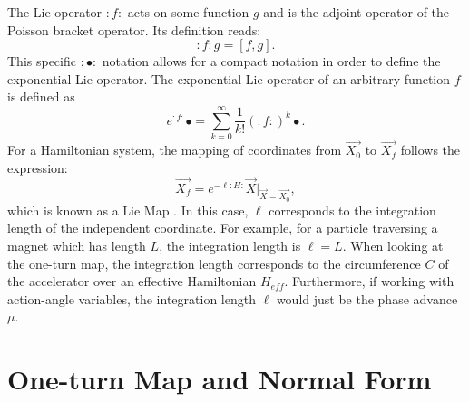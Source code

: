 The Lie operator $:f:$ acts on some function $g$ and is the adjoint operator of the Poisson bracket operator. Its definition reads:
\begin{equation}
    \label{eq:ch2lie1}
    :f:g = \left[ f,g \right].
\end{equation}
This specific $:\bullet:$ notation allows for a compact notation in order to define the exponential Lie operator. The exponential Lie operator of an arbitrary function $f$ is defined as
\begin{equation}
    \label{eq:ch2explie1}
    e^{:f:}\bullet = \sum_{k=0}^{\infty}\frac{1}{k!}\left( :f: \right)^k \bullet.
\end{equation}
For a Hamiltonian system, the mapping of coordinates from $\vec{X_0}$ to $\vec{X_f}$ follows the expression:
\begin{equation}
    \label{eq:ch2liemap1}
    \vec{X_f}=e^{-\ell :H:}\vec{X}\bigg\rvert_{\vec{X}=\vec{X_0}},
\end{equation}
which is known as a Lie Map \cite{todd1}. In this case, $\ell$ corresponds to the integration length of the independent coordinate. For example, for a particle traversing a magnet which has length $L$, the integration length is $\ell = L$. When looking at the one-turn map, the integration length corresponds to the circumference $C$ of the accelerator over an effective Hamiltonian $H_{eff}$. Furthermore, if working with action-angle variables, the integration length $\ell$ would just be the phase advance $\mu$.\\ 

\section{\label{sec:oneturn}One-turn Map and Normal Form}

